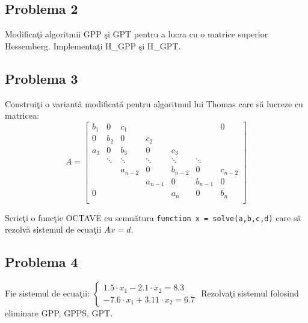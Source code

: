 \documentclass{exam}
\begin{document}
\subsection{Problema 2}
Modifica\c{t}i algoritmii GPP \c{s}i GPT pentru a lucra cu o matrice superior Hessemberg. Implementa\c{t}i H\_GPP \c{s}i H\_GPT.

\subsection{Problema 3}
Construi\c{t}i o variant\u{a} modificat\u{a} pentru algoritmul lui Thomas care s\u{a} lucreze cu matricea:
\[
	A = \begin{bmatrix}
		{b_1} & { 0 }  & {c_1}      & {   }      & {   }     & {   }     & { 0 }     \\
		{ 0 } & {b_2}  & { 0 }      & {c_2}      & {   }     & {   }     & {   }     \\
		{a_3} & { 0 }  & {b_3}      & { 0 }      & {c_3}     & {   }     & {   }     \\
		{   } & \ddots & \ddots     & \ddots     & \ddots    & \ddots    & {   }     \\
		{   } & {   }  & { a_{n-2}} & { 0 }      & {b_{n-2}} & { 0 }     & {c_{n-2}} \\
		{   } & {   }  & {   }      & { a_{n-1}} & { 0 }     & {b_{n-1}} & { 0 }     \\
		{ 0 } & {   }  & {   }      & {   }      & {a_n}     & { 0 }     & {b_n}     \\
	\end{bmatrix}
\]

Scrie\c{t}i o func\c{t}ie OCTAVE cu semn\u{a}tura \verb|function x = solve(a,b,c,d)| care s\u{a} rezolv\u{a} sistemul de ecua\c{t}ii $Ax = d$.


\subsection{Problema 4}
Fie sistemul de ecua\c{t}ii:
$\displaystyle
	\begin{cases} 1.5 \cdot x_1 - 2.1 \cdot x_2 = 8.3 \\
		-7.6 \cdot x_1 + 3.11 \cdot x_2 = 6.7
	\end{cases}$
Rezolva\c{t}i sistemul folosind eliminare GPP, GPPS, GPT.


\end{document}
